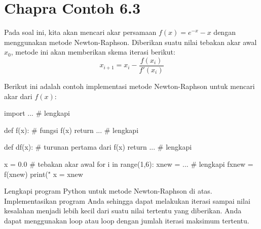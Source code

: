 \section{Chapra Contoh 6.3}
Pada soal ini, kita akan mencari akar persamaan $f(x) = e^{-x} - x$ dengan
menggunakan metode Newton-Raphson. Diberikan suatu nilai tebakan akar
awal $x_{0}$, metode ini akan memberikan skema iterasi berikut:
\begin{equation}
x_{i+1} = x_{i} - \frac{f(x_{i})}{f'(x_{i})}
\end{equation}

Berikut ini adalah contoh implementasi metode Newton-Raphson untuk
mencari akar dari $f(x)$:
\begin{pythoncode}
import ... # lengkapi

def f(x): # fungsi f(x)
    return ...  # lengkapi
    
def df(x): # turunan pertama dari f(x)
    return ... # lengkapi

x = 0.0 # tebakan akar awal
for i in range(1,6):
    xnew = ... # lengkapi
    fxnew = f(xnew)
    print("%
    x = xnew    
\end{pythoncode}

\begin{soal}
Lengkapi program Python untuk metode Newton-Raphson di atas.
Implementasikan program Anda sehingga
dapat melakukan iterasi sampai nilai kesalahan menjadi lebih kecil dari
suatu nilai tertentu yang diberikan. Anda dapat menggunakan loop 
atau loop  dengan jumlah iterasi maksimum tertentu.
\end{soal}